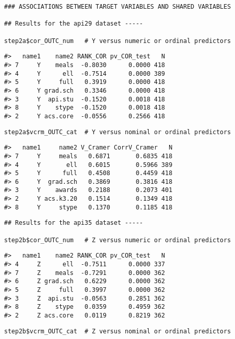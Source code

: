 \begin{verbatim}
### ASSOCIATIONS BETWEEN TARGET VARIABLES AND SHARED VARIABLES

## Results for the api29 dataset -----

step2a$cor_OUTC_num   # Y versus numeric or ordinal predictors
\end{verbatim}

\begin{verbatim}
#>   name1    name2 RANK_COR pv_COR_test   N
#> 7     Y    meals  -0.8030      0.0000 418
#> 4     Y      ell  -0.7514      0.0000 389
#> 5     Y     full   0.3919      0.0000 418
#> 6     Y grad.sch   0.3346      0.0000 418
#> 3     Y  api.stu  -0.1520      0.0018 418
#> 8     Y    stype  -0.1520      0.0018 418
#> 2     Y acs.core  -0.0556      0.2566 418
\end{verbatim}

\begin{verbatim}
step2a$vcrm_OUTC_cat  # Y versus nominal or ordinal predictors
\end{verbatim}

\begin{verbatim}
#>   name1     name2 V_Cramer CorrV_Cramer   N
#> 7     Y     meals   0.6871       0.6835 418
#> 4     Y       ell   0.6015       0.5966 389
#> 5     Y      full   0.4508       0.4459 418
#> 6     Y  grad.sch   0.3869       0.3816 418
#> 3     Y    awards   0.2188       0.2073 401
#> 2     Y acs.k3.20   0.1514       0.1349 418
#> 8     Y     stype   0.1370       0.1185 418
\end{verbatim}

\begin{verbatim}
## Results for the api35 dataset -----

step2b$cor_OUTC_num   # Z versus numeric or ordinal predictors
\end{verbatim}

\begin{verbatim}
#>   name1    name2 RANK_COR pv_COR_test   N
#> 4     Z      ell  -0.7511      0.0000 337
#> 7     Z    meals  -0.7291      0.0000 362
#> 6     Z grad.sch   0.6229      0.0000 362
#> 5     Z     full   0.3997      0.0000 362
#> 3     Z  api.stu  -0.0563      0.2851 362
#> 8     Z    stype   0.0359      0.4959 362
#> 2     Z acs.core   0.0119      0.8219 362
\end{verbatim}

\begin{verbatim}
step2b$vcrm_OUTC_cat  # Z versus nominal or ordinal predictors
\end{verbatim}

